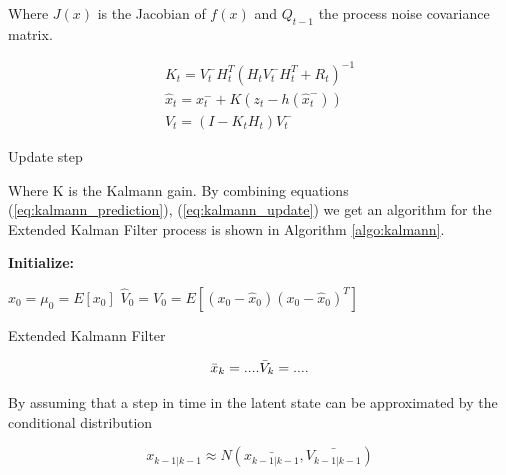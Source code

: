 \documentclass[mscthesis]{usiinfthesis}
\begin{document}
Where $J(x)$ is the Jacobian of $f(x)$ and $Q_{t-1}$ the process noise covariance matrix.


\begin{eqfloat}[H]
\begin{equation}
\begin{array}{l}
K_t = V_t^- H^T_t (H_t V_t^- H^T_t + R_t)^{-1} \\
\hat{x}_t = x_t^- + K (z_t - h(\hat{x}_t^-)) \\
V_t = (I-K_t H_t)V_t^-
\end{array}
\label{eq:kalman_update}
\end{equation}
\caption{Update step}
\label{eq:kalmann_update}
\end{eqfloat}

Where K is the Kalmann gain. By combining equations (\ref{eq:kalmann_prediction}), (\ref{eq:kalmann_update}) we get an algorithm for the Extended Kalman Filter process is shown in Algorithm \ref{algo:kalmann}. 

\begin{algorithm}[H]
\textbf{Initialize: }
\begin{substeps}
$\hat{x}_0 = \mu_0 = E[x_0]$ \;
$\hat{V}_0 = V_0 = E[(x_0-\hat{x}_0)(x_0-\hat{x}_0)^T]$  \;
\end{substeps}
  \caption{Extended Kalmann Filter}
  \label{algo:kalmann}
\end{algorithm}



\[
\bar{x}_{k} = .... \\
\bar{V}_{k} = ....
\]

By assuming that a step in time in the latent state can be approximated by the conditional distribution 

\[
x_{k-1 | k-1} \approx N(\bar{x_{k-1 | k-1}}, \bar{V_{k-1|k-1}})
\]
\end{document}

